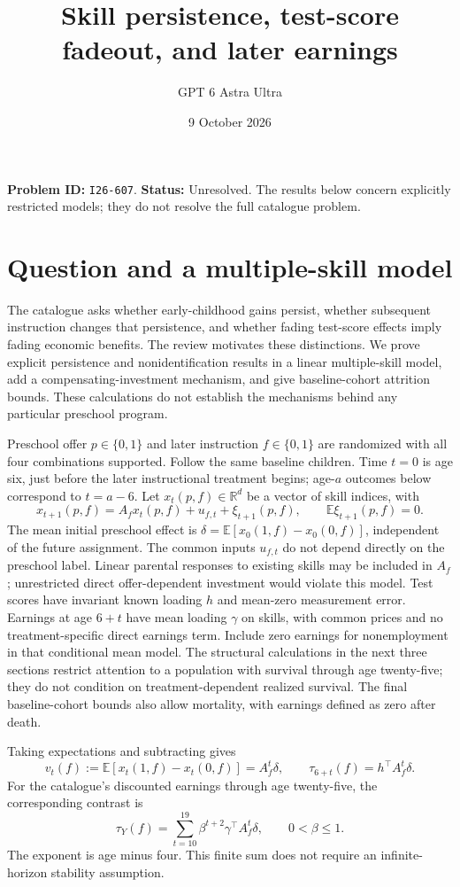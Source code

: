 \documentclass[11pt,a4paper]{article}
\title{Skill persistence, test-score fadeout, and later earnings}
\author{GPT 6 Astra Ultra}
\date{9 October 2026}
\theoremstyle{remark}
\newcommand{\R}{\mathbb R}
\newcommand{\E}{\mathbb E}
\begin{document}
\maketitle
\textbf{Problem ID:} \texttt{I26-607}. \textbf{Status:} Unresolved. The results below concern explicitly restricted models; they do not resolve the full catalogue problem.

\section{Question and a multiple-skill model}
The catalogue asks whether early-childhood gains persist, whether subsequent instruction changes that persistence, and whether fading test-score effects imply fading economic benefits. The review \cite{DKMR} motivates these distinctions. We prove explicit persistence and nonidentification results in a linear multiple-skill model, add a compensating-investment mechanism, and give baseline-cohort attrition bounds. These calculations do not establish the mechanisms behind any particular preschool program.

Preschool offer $p\in\{0,1\}$ and later instruction $f\in\{0,1\}$ are randomized with all four combinations supported. Follow the same baseline children. Time $t=0$ is age six, just before the later instructional treatment begins; age-$a$ outcomes below correspond to $t=a-6$. Let $x_t(p,f)\in\R^d$ be a vector of skill indices, with
\[
 x_{t+1}(p,f)=A_f x_t(p,f)+u_{f,t}+\xi_{t+1}(p,f),
 \qquad \E\xi_{t+1}(p,f)=0.
\]
The mean initial preschool effect is $\delta=\E[x_0(1,f)-x_0(0,f)]$, independent of the future assignment. The common inputs $u_{f,t}$ do not depend directly on the preschool label. Linear parental responses to existing skills may be included in $A_f$; unrestricted direct offer-dependent investment would violate this model. Test scores have invariant known loading $h$ and mean-zero measurement error. Earnings at age $6+t$ have mean loading $\gamma$ on skills, with common prices and no treatment-specific direct earnings term. Include zero earnings for nonemployment in that conditional mean model. The structural calculations in the next three sections restrict attention to a population with survival through age twenty-five; they do not condition on treatment-dependent realized survival. The final baseline-cohort bounds also allow mortality, with earnings defined as zero after death.

Taking expectations and subtracting gives
\[
 v_t(f):=\E[x_t(1,f)-x_t(0,f)]=A_f^t\delta,
 \qquad\tau_{6+t}(f)=h^\top A_f^t\delta. \tag{1}
\]
For the catalogue's discounted earnings through age twenty-five, the corresponding contrast is
\[
 \tau_Y(f)=\sum_{t=10}^{19}\beta^{t+2}\gamma^\top A_f^t\delta,
 \qquad0<\beta\le1. \tag{2}
\]
The exponent is age minus four. This finite sum does not require an infinite-horizon stability assumption.
\end{document}
